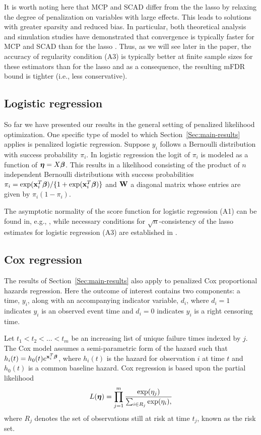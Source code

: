 It is worth noting here that MCP and SCAD differ from the the lasso by relaxing the degree of penalization on variables with large effects.  This leads to solutions with greater sparsity and reduced bias.  In particular, both theoretical analysis and simulation studies have demonstrated that convergence is typically faster for MCP and SCAD than for the lasso \citep{MCP,SCAD,Breheny2011}.  Thus, as we will see later in the paper, the accuracy of regularity condition (A3) is typically better at finite sample sizes for these estimators than for the lasso and as a consequence, the resulting mFDR bound is tighter (i.e., less conservative).

\subsection{Logistic regression}

So far we have presented our results in the general setting of penalized likelihood optimization. One specific type of model to which Section~\ref{Sec:main-results} applies is penalized logistic regression. Suppose $y_i$ follows a Bernoulli distribution with success probability $\pi_i$. In logistic regression the logit of $\pi_i$ is modeled as a function of $\boldsymbol{\eta} = X\boldsymbol{\beta}$.  This results in a likelihood consisting of the product of $n$ independent Bernoulli distributions with success probabilities $\pi_i = \exp(\mathbf{x}_i^T\boldsymbol{\beta})/\{1 + \exp(\mathbf{x}_i^T\boldsymbol{\beta})\}$ and $\mathbf{W}$ a diagonal matrix whose entries are given by $\pi_i(1-\pi_i)$.

The asymptotic normality of the score function for logistic regression (A1) can be found in, e.g., \citet{McCullagh1989}, while necessary conditions for $\sqrt{n}$-consistency of the lasso estimates for logistic regression (A3) are established in \citet{SCAD}.

\subsection{Cox regression}
\label{Sec:cox}

The results of Section~\ref{Sec:main-results} also apply to penalized Cox proportional hazards regression. Here the outcome of interest contains two components: a time, $y_i$, along with an accompanying indicator variable, $d_i$, where $d_i = 1$ indicates $y_i$ is an observed event time and $d_i = 0$ indicates $y_i$ is a right censoring time.

Let $t_1 < t_2 < \ldots < t_m$ be an increasing list of unique failure times indexed by $j$. The Cox model assumes a semi-parametric form of the hazard such that $h_i(t) = h_0(t)e^{\mathbf{x}_i^T \boldsymbol{\beta}}$, where $h_i(t)$ is the hazard for observation $i$ at time $t$ and $h_0(t)$ is a common baseline hazard. Cox regression is based upon the partial likelihood \citep{Cox1972}
\begin{equation*}
L(\boldsymbol{\eta})  = \prod_{j=1}^{m} \frac{\exp(\eta_j)}{\sum_{i \in R_j} \exp(\eta_i),} 
\end{equation*}
where $R_j$ denotes the set of observations still at risk at time $t_j$, known as the risk set.

